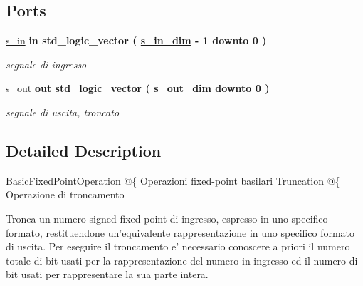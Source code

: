 \subsection*{Ports}
 \begin{DoxyCompactItemize}
\item 
\hyperlink{classtruncate_a6d6bd3ddfff26c223f1752f25545e304}{s\+\_\+in}  {\bfseries {\bfseries \textcolor{vhdlchar}{in}\textcolor{vhdlchar}{ }}} {\bfseries \textcolor{vhdlchar}{std\+\_\+logic\+\_\+vector}\textcolor{vhdlchar}{ }\textcolor{vhdlchar}{(}\textcolor{vhdlchar}{ }\textcolor{vhdlchar}{ }\textcolor{vhdlchar}{ }\textcolor{vhdlchar}{ }{\bfseries \hyperlink{classtruncate_ad3d18243ad6fe53a2277e2aa9b94ca45}{s\+\_\+in\+\_\+dim}} \textcolor{vhdlchar}{-\/}\textcolor{vhdlchar}{ } \textcolor{vhdldigit}{1} \textcolor{vhdlchar}{ }\textcolor{vhdlchar}{downto}\textcolor{vhdlchar}{ }\textcolor{vhdlchar}{ } \textcolor{vhdldigit}{0} \textcolor{vhdlchar}{ }\textcolor{vhdlchar}{)}\textcolor{vhdlchar}{ }} 
\begin{DoxyCompactList}\small\item\em segnale di ingresso \end{DoxyCompactList}\item 
\hyperlink{classtruncate_a7c0b5e84820296cfa624ce710d19debd}{s\+\_\+out}  {\bfseries {\bfseries \textcolor{vhdlchar}{out}\textcolor{vhdlchar}{ }}} {\bfseries \textcolor{vhdlchar}{std\+\_\+logic\+\_\+vector}\textcolor{vhdlchar}{ }\textcolor{vhdlchar}{(}\textcolor{vhdlchar}{ }\textcolor{vhdlchar}{ }\textcolor{vhdlchar}{ }\textcolor{vhdlchar}{ }{\bfseries \hyperlink{classtruncate_a8b62f8bfecb0fab845995b8b051101bc}{s\+\_\+out\+\_\+dim}} \textcolor{vhdlchar}{ }\textcolor{vhdlchar}{downto}\textcolor{vhdlchar}{ }\textcolor{vhdlchar}{ } \textcolor{vhdldigit}{0} \textcolor{vhdlchar}{ }\textcolor{vhdlchar}{)}\textcolor{vhdlchar}{ }} 
\begin{DoxyCompactList}\small\item\em segnale di uscita, troncato \end{DoxyCompactList}\end{DoxyCompactItemize}


\subsection{Detailed Description}
Basic\+Fixed\+Point\+Operation @\{  Operazioni fixed-\/point basilari  Truncation @\{  Operazione di troncamento

Tronca un numero signed fixed-\/point di ingresso, espresso in uno specifico formato, restituendone un'equivalente rappresentazione in uno specifico formato di uscita. Per eseguire il troncamento e' necessario conoscere a priori il numero totale di bit usati per la rappresentazione del numero in ingresso ed il numero di bit usati per rappresentare la sua parte intera. 

